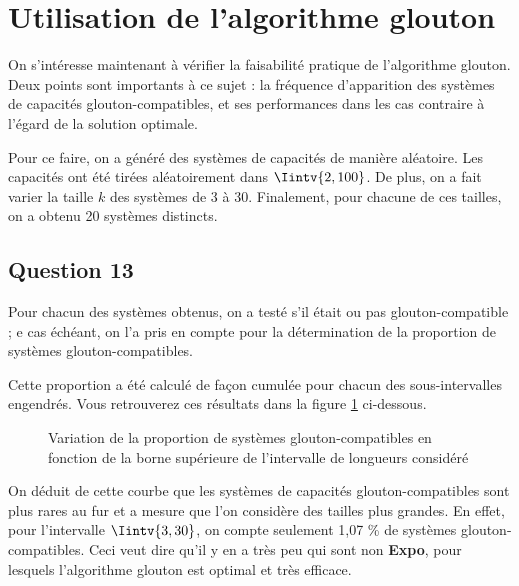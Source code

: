 \documentclass[12pt,a4paper]{article}
\begin{document}
\newpage

\section{Utilisation de l'algorithme glouton}
 On s'int\'eresse maintenant \`a v\'erifier la faisabilit\'e pratique de l'algorithme glouton. Deux points sont importants \`a ce sujet : la fr\'equence d'apparition des syst\`emes de capacit\'es glouton-compatibles, et ses performances dans les cas contraire \`a l'\'egard de la solution optimale.
 
 Pour ce faire, on a g\'en\'er\'e des syst\`emes de capacit\'es de mani\`ere al\'eatoire. Les capacit\'es ont \'et\'e tir\'ees al\'eatoirement dans $\Iintv{2,100}$. De plus, on a fait varier la taille $k$ des syst\`emes de 3 \`a 30. Finalement, pour chacune de ces tailles, on a obtenu 20 syst\`emes distincts.

 \subsection*{Question 13}
 Pour chacun des syst\`emes obtenus, on a test\'e s'il \'etait ou pas glouton-compatible ; e cas \'ech\'eant, on l'a pris en compte pour la d\'etermination de la proportion de syst\`emes glouton-compatibles.
 
 Cette proportion a \'et\'e calcul\'e de fa\c{c}on cumul\'ee pour chacun des sous-intervalles engendr\'es. Vous retrouverez ces r\'esultats dans la figure \ref{fig:prop} ci-dessous.
 
\begin{figure}[!h]
  \centering
  \captionsetup{justification=centering}
  \caption[Variation de la proportion de syst\`emes glouton-compatibles]{Variation de la proportion de syst\`emes glouton-compatibles en fonction de la borne sup\'erieure de l'intervalle de longueurs consid\'er\'e}
  \label{fig:prop}
\end{figure}

On d\'eduit de cette courbe que les syst\`emes de capacit\'es glouton-compatibles sont plus rares au fur et a mesure que l'on consid\`ere des tailles plus grandes. En effet, pour l'intervalle $\Iintv{3,30}$, on compte seulement 1,07 \% de syst\`emes glouton-compatibles. Ceci veut dire qu'il y en a tr\`es peu qui sont non {\bfseries Expo}, pour lesquels l'algorithme glouton est optimal et tr\`es efficace.
\end{document}
